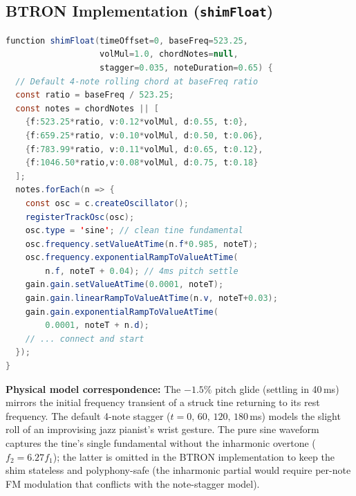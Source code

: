 \documentclass[10pt,journal,compsoc,twocolumn]{article}
\begin{document}
\subsection{BTRON Implementation (\texttt{shimFloat})}

\begin{lstlisting}[language=Java,
    caption={\texttt{shimFloat}: Imada Fender Rhodes / glass harp (line 3408).}]
function shimFloat(timeOffset=0, baseFreq=523.25,
                   volMul=1.0, chordNotes=null,
                   stagger=0.035, noteDuration=0.65) {
  // Default 4-note rolling chord at baseFreq ratio
  const ratio = baseFreq / 523.25;
  const notes = chordNotes || [
    {f:523.25*ratio, v:0.12*volMul, d:0.55, t:0},
    {f:659.25*ratio, v:0.10*volMul, d:0.50, t:0.06},
    {f:783.99*ratio, v:0.11*volMul, d:0.65, t:0.12},
    {f:1046.50*ratio,v:0.08*volMul, d:0.75, t:0.18}
  ];
  notes.forEach(n => {
    const osc = c.createOscillator();
    registerTrackOsc(osc);
    osc.type = 'sine'; // clean tine fundamental
    osc.frequency.setValueAtTime(n.f*0.985, noteT);
    osc.frequency.exponentialRampToValueAtTime(
        n.f, noteT + 0.04); // 4ms pitch settle
    gain.gain.setValueAtTime(0.0001, noteT);
    gain.gain.linearRampToValueAtTime(n.v, noteT+0.03);
    gain.gain.exponentialRampToValueAtTime(
        0.0001, noteT + n.d);
    // ... connect and start
  });
}
\end{lstlisting}

\textbf{Physical model correspondence:}
The $-1.5\%$ pitch glide (settling in 40\,ms) mirrors the initial frequency
transient of a struck tine returning to its rest frequency.  The default
4-note stagger ($t = 0,\,60,\,120,\,180$\,ms) models the slight roll of an
improvising jazz pianist's wrist gesture.  The pure sine waveform captures
the tine's single fundamental without the inharmonic overtone ($f_2 = 6.27f_1$);
the latter is omitted in the BTRON implementation to keep the shim stateless
and polyphony-safe (the inharmonic partial would require per-note FM modulation
that conflicts with the note-stagger model).
\end{document}
